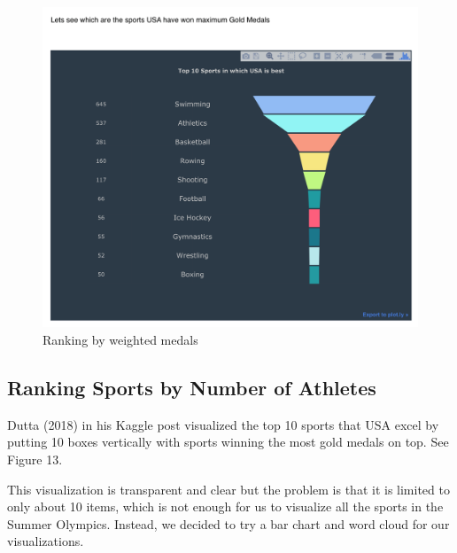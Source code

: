 \documentclass[12pt]{article}
\begin{document}
\begin{figure}[!b]
    \centering
    \includegraphics[trim={0 1.9cm 0 2.7cm},clip, scale=0.5]{pics/4-1.png}
    \caption{Ranking by weighted medals}
    \label{fig:my_label}
\end{figure}

\subsection{Ranking Sports by Number of Athletes}
Dutta (2018) in his Kaggle post visualized the top 10 sports that USA excel by putting 10 boxes vertically with sports winning the most gold medals on top. See Figure 13.

This visualization is transparent and clear but the problem is that it is limited to only about 10 items, which is not enough for us to visualize all the sports in the Summer Olympics. Instead, we decided to try a bar chart and word cloud for our visualizations. 
\end{document}
